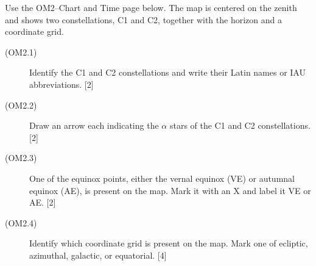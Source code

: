 Use the OM2--Chart and Time page below. The map is centered on the zenith and shows two constellations, C1 and C2, together with the horizon and a coordinate grid.
\begin{description}
\item[(OM2.1)] Identify the C1 and C2 constellations and write their Latin names or IAU abbreviations. \hfill[2]
\item[(OM2.2)] Draw an arrow each indicating the $\alpha$ stars of the C1 and C2 constellations. \hfill[2]
\item[(OM2.3)] One of the equinox points, either the vernal equinox (VE) or autumnal equinox (AE), is present on the map. Mark it with an X and label it VE or AE. \hfill[2]
\item[(OM2.4)] Identify which coordinate grid is present on the map. Mark one of ecliptic, azimuthal, galactic, or equatorial. \hfill[4]
\end{description}
